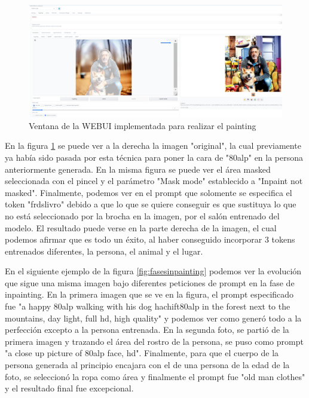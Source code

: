 \begin{figure}[h]
	\centering
	\includegraphics[width = 1
	\textwidth]{Imagenes/Vectorial/inpainting1.png}
	\caption{Ventana de la WEBUI implementada para realizar el painting}
	\label{fig:inpainting1}
\end{figure}

En la figura \ref{fig:inpainting1} se puede ver a la derecha la imagen "original", la cual previamente ya había sido pasada por esta técnica para poner la cara de "80alp" en la persona anteriormente generada. En la misma figura se puede ver el área masked seleccionada con el pincel y el parámetro "Mask mode" establecido a "Inpaint not masked". Finalmente, podemos ver en el prompt que solomente se especifica el token "frdslivro" debido a que lo que se quiere conseguir es que sustituya lo que no está seleccionado por la brocha en la imagen, por el salón entrenado del modelo. El resultado puede verse en la parte derecha de la imagen, el cual podemos afirmar que es todo un éxito, al haber conseguido incorporar 3 tokens entrenados diferentes, la persona, el animal y el lugar. 

En el siguiente ejemplo de la figura \ref{fig:fasesinpainting} podemos ver la evolución que sigue una misma imagen bajo diferentes peticiones de prompt en la fase de inpainting. En la primera imagen que se ve en la figura, el prompt especificado fue "a happy 80alp walking with his dog hachift80alp in the forest next to the mountains, day light, full hd, high quality" y podemos ver como generó todo a la perfección excepto a la persona entrenada. En la segunda foto, se partió de la primera imagen y trazando el área del rostro de la persona, se puso como prompt "a close up picture of 80alp face, hd". Finalmente, para que el cuerpo de la persona generada al principio encajara con el de una persona de la edad de la foto, se seleccionó la ropa como área y finalmente el prompt fue "old man clothes" y el resultado final fue excepcional. 

